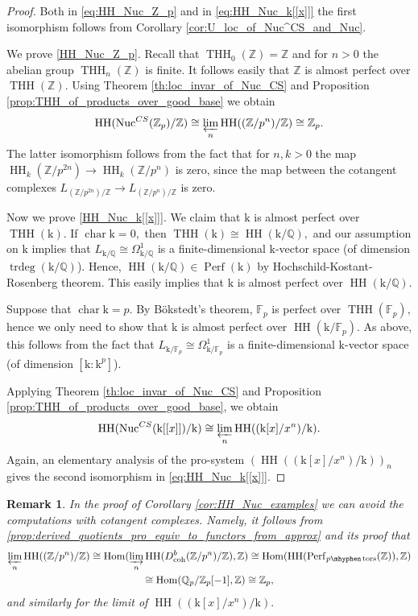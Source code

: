 \documentclass[11pt,leqno]{amsart}
\newtheorem{remark}[theo]{Remark}
\numberwithin{equation}{section}
\def\Z{\mathbb{Z}}
\def\Q{\mathbb{Q}}
\def\coh{\operatorname{coh}}
\def\FF{{\mathbb F}}
\def\Hom{\operatorname{Hom}}
\newcommand{\hy}{\mhyphen}
\newcommand{\indlim}[1][]{\mathop{\varinjlim}\limits_{#1}}
\newcommand{\prolim}[1][]{\mathop{\varprojlim}\limits_{#1}}
\newcommand{\Nuc}{\operatorname{Nuc}}
\newcommand{\mk}{\mathrm k}
\newcommand{\THH}{\operatorname{THH}}
\newcommand{\HH}{\operatorname{HH}}
\newcommand{\Perf}{\operatorname{Perf}}
\newcommand{\cha}{\operatorname{char}}
\newcommand{\tors}{\operatorname{tors}}
\newcommand{\trdeg}{\operatorname{trdeg}}
\begin{document}
\begin{proof}
Both in \eqref{eq:HH_Nuc_Z_p} and in \eqref{eq:HH_Nuc_k[[x]]} the first isomorphism follows from Corollary \ref{cor:U_loc_of_Nuc^CS_and_Nuc}.

We prove \ref{HH_Nuc_Z_p}. Recall that $\THH_0(\Z)=\Z$ and for $n>0$ the abelian group $\THH_n(\Z)$ is finite. It follows easily that $\Z$ is almost perfect over $\THH(\Z).$ Using Theorem \ref{th:loc_invar_of_Nuc_CS} and Proposition \ref{prop:THH_of_products_over_good_base} we obtain
\begin{equation*}
\HH(\Nuc^{CS}(\Z_p)/\Z)\cong\prolim[n]\HH((\Z/p^n)/\Z)\cong\Z_p.
\end{equation*}
The latter isomorphism follows from the fact that for $n,k>0$ the map $\HH_k(\Z/p^{2n})\to\HH_k(\Z/p^n)$ is zero, since the map between the cotangent complexes $L_{(\Z/p^{2n})/\Z}\to L_{(\Z/p^{n})/\Z}$ is zero.

Now we prove \ref{HH_Nuc_k[[x]]}. We claim that $\mk$ is almost perfect over $\THH(\mk).$ If $\cha \mk=0,$ then $\THH(\mk)\cong \HH(\mk/\Q),$ and our assumption on $\mk$ implies that $L_{\mk/\Q}\cong \Omega^1_{\mk/\Q}$ is a finite-dimensional $\mk$-vector space (of dimension $\trdeg(\mk/\Q)$). Hence, $\HH(\mk/\Q)\in\Perf(\mk)$ by Hochschild-Kostant-Rosenberg theorem. This easily implies that $\mk$ is almost perfect over $\HH(\mk/\Q).$

Suppose that $\cha\mk = p.$ By B\"okstedt's theorem, $\FF_p$ is perfect over $\THH(\FF_p),$ hence we only need to show that $\mk$ is almost perfect over $\HH(\mk/\FF_p).$ As above, this follows from the fact that $L_{\mk/\FF_p}\cong\Omega^1_{\mk/\FF_p}$ is a finite-dimensional $\mk$-vector space (of dimension $[\mk:\mk^p]$).

Applying Theorem \ref{th:loc_invar_of_Nuc_CS} and Proposition \ref{prop:THH_of_products_over_good_base}, we obtain
\begin{equation*}
\HH(\Nuc^{CS}(\mk[[x]])/\mk)\cong\prolim[n]\HH((\mk[x]/x^n)/\mk).
\end{equation*}
Again, an elementary analysis of the pro-system $(\HH((\mk[x]/x^n)/\mk))_n$ gives the second isomorphism in \eqref{eq:HH_Nuc_k[[x]]}.
\end{proof}

\begin{remark}
In the proof of Corollary \ref{cor:HH_Nuc_examples} we can avoid the computations with cotangent complexes. Namely, it follows from \ref{prop:derived_quotients_pro_equiv_to_functors_from_approx} and its proof that
\begin{multline*}
\prolim[n]\HH((\Z/p^n)/\Z)\cong \Hom(\indlim[n]\HH(D^b_{\coh}(\Z/p^n)/\Z),\Z)\cong \Hom(\HH(\Perf_{p\hy\tors}(\Z)),\Z)\\
\cong \Hom(\Q_p/\Z_p[-1],\Z)\cong \Z_p,
\end{multline*}
and similarly for the limit of $\HH((\mk[x]/x^n)/\mk).$
\end{remark}
\end{document}
